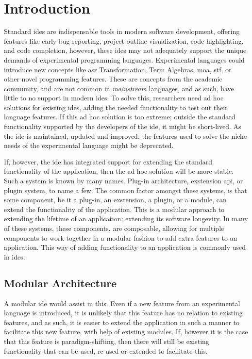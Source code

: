 \chapter{Introduction}

Standard \gls{ide}s are indispensable tools in modern software development,
offering features like early bug reporting, project outline visualization, code
highlighting, and code completion, however, these \gls{ide}s may not adequately
support the unique demands of experimental programming languages. Experimental
languages could introduce new concepts like \gls{asr} Transformation, Term
Algebras, \gls{moa}, \gls{stf}, or other novel programming features. These are
concepts from the academic community, and are not common in \textit{mainstream}
languages, and as such, have little to no support in modern \gls{ide}s. To solve
this, researchers need ad hoc solutions for existing \gls{ide}s, adding the
needed functionality to test out their language features. If this ad hoc
solution is too extreme; outside the standard functionality supported by the
developers of the \gls{ide}, it might be short-lived. As the \gls{ide} is
maintained, updated and improved, the features used to solve the niche needs of
the experimental language might be deprecated.

If, however, the \gls{ide} has integrated support for extending the standard
functionality of the application, then the ad hoc solution will be more stable.
Such a system is known by many names. Plug-in architecture, exstension
\gls{api}, or plugin system, to name a few. The common factor amongst these
systems, is that some component, be it a plug-in, an exstension, a plugin, or a
module, can extend the functionality of the application. This is a modular
approach to extending the lifetime of an application; extending its software
longevity. In many of these systems, these components, are composable,
allowing for multiple components to work together in a modular fashion to add
extra features to an application. This way of adding functionality to an
application is commonly used in \gls{ide}s.


\section{Modular Architecture}

A modular \gls{ide} would assist in this. Even if a new feature from an
experimental language is introduced, it is unlikely that this feature has no
relation to existing features, and as such, it is easier to extend the
application in such a manner to facilitate this new feature, with help of
existing modules. If, however it is the case that this feature is
paradigm-shifting, then there will still be existing functionality that can be
used, re-used or extended to facilitate this.

